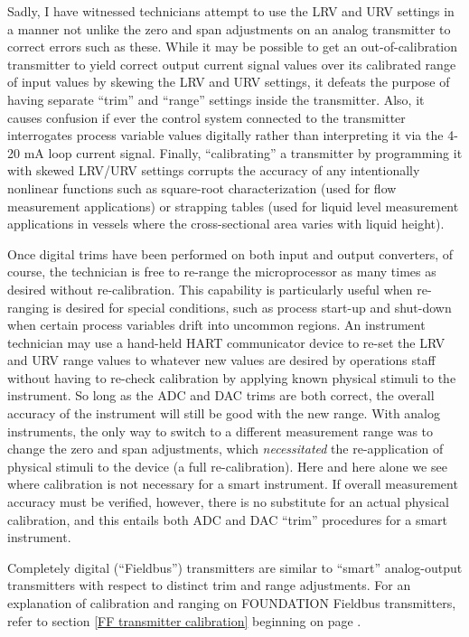 \vskip 10pt

\filbreak

Sadly, I have witnessed technicians attempt to use the LRV and URV settings in a manner not unlike the zero and span adjustments on an analog transmitter to correct errors such as these.  While it may be possible to get an out-of-calibration transmitter to yield correct output current signal values over its calibrated range of input values by skewing the LRV and URV settings, it defeats the purpose of having separate ``trim'' and ``range'' settings inside the transmitter.  Also, it causes confusion if ever the control system connected to the transmitter interrogates process variable values digitally rather than interpreting it via the 4-20 mA loop current signal.  Finally, ``calibrating'' a transmitter by programming it with skewed LRV/URV settings corrupts the accuracy of any intentionally nonlinear functions such as square-root characterization (used for flow measurement applications) or strapping tables (used for liquid level measurement applications in vessels where the cross-sectional area varies with liquid height).

Once digital trims have been performed on both input and output converters, of course, the technician is free to re-range the microprocessor as many times as desired without re-calibration.  This capability is particularly useful when re-ranging is desired for special conditions, such as process start-up and shut-down when certain process variables drift into uncommon regions.  An instrument technician may use a hand-held HART communicator device to re-set the LRV and URV range values to whatever new values are desired by operations staff without having to re-check calibration by applying known physical stimuli to the instrument.  So long as the ADC and DAC trims are both correct, the overall accuracy of the instrument will still be good with the new range.  With analog instruments, the only way to switch to a different measurement range was to change the zero and span adjustments, which \textit{necessitated} the re-application of physical stimuli to the device (a full re-calibration).  Here and here alone we see where calibration is not necessary for a smart instrument.  If overall measurement accuracy must be verified, however, there is no substitute for an actual physical calibration, and this entails both ADC and DAC ``trim'' procedures for a smart instrument.

\vskip 10pt

Completely digital (``Fieldbus'') transmitters are similar to ``smart'' analog-output transmitters with respect to distinct trim and range adjustments.  For an explanation of calibration and ranging on FOUNDATION Fieldbus transmitters, refer to section \ref{FF transmitter calibration} beginning on page \pageref{FF transmitter calibration}.









